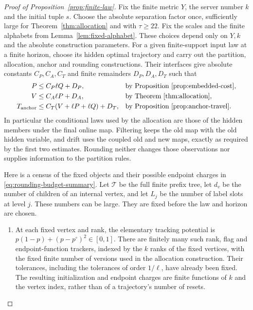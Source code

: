\begin{proof}[Proof of Proposition~\ref{prop:finite-law}]
Fix the finite metric $Y$, the server number $k$ and the initial tuple $s$.
Choose the absolute separation factor once, sufficiently large for
Theorem~\ref{thm:allocation} and with $\tau\ge22$.  Fix the scales and the
finite alphabets from Lemma~\ref{lem:fixed-alphabet}.  These choices depend
only on $Y,k$ and the absolute construction parameters.  For a given
finite-support input law at a finite horizon, choose its hidden optimal
trajectory and carry out the partition, allocation, anchor and rounding
constructions.  Their interfaces give absolute constants $C_P,C_A,C_T$ and
finite remainders $D_P,D_A,D_T$ such that
\begin{equation}\label{eq:rounding-budget-summary}
 \begin{aligned}
 P&\le C_P\ell Q+D_P,
       &&\text{by Proposition~\ref{prop:embedded-cost}},\\
 V&\le C_A\ell P+D_A,
       &&\text{by Theorem~\ref{thm:allocation}},\\
 T_{\rm anchor}&\le C_T(V+\ell P+\ell Q)+D_T,
       &&\text{by Proposition~\ref{prop:anchor-travel}}.
 \end{aligned}
\end{equation}
In particular the conditional laws used by the allocation are those of
the hidden members under the final online map.  Filtering keeps the old
map with the old hidden variable, and drift uses the coupled old and new
maps, exactly as required by the first two estimates.  Rounding neither
changes those observations nor supplies information to the partition rules.

Here is a census of the fixed objects and their possible endpoint charges
in \eqref{eq:rounding-budget-summary}.  Let $\mathcal T$ be the full finite
prefix tree, let $d_v$ be the number of children of an internal vertex,
and let $L_j$ be the number of label slots at level $j$.  These numbers can
be large.  They are fixed before the law and horizon are chosen.

\begin{enumerate}
\item At each fixed vertex and rank, the elementary tracking potential is
$p(1-p)+(p-p^\circ)^2\in[0,1]$.  There are finitely many such rank,
flag and endpoint-function trackers, indexed by the $k$ ranks of the
fixed vertices, with the fixed finite number of versions used in the
allocation construction.  Their tolerances, including the tolerances of
order $1/\ell$, have already been fixed.  The resulting initialization and
endpoint charges are finite functions of $k$ and the vertex index, rather
than of a trajectory's number of resets.


\end{enumerate}
\end{proof}
